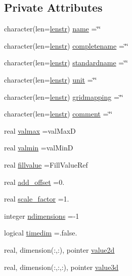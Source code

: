 \subsection*{Private Attributes}
\begin{DoxyCompactItemize}
\item 
character(len=\mbox{\hyperlink{namespacencdflib_a7d52315e1d9f473093f6f8fa245ea084}{lenstr}}) \mbox{\hyperlink{structncdflib_1_1t__varcf_a6796936503dc7771c79453eff76a90ac}{name}} =\char`\"{}\char`\"{}
\item 
character(len=\mbox{\hyperlink{namespacencdflib_a7d52315e1d9f473093f6f8fa245ea084}{lenstr}}) \mbox{\hyperlink{structncdflib_1_1t__varcf_a81068c0024daf690636e9796f0f04e10}{completename}} =\char`\"{}\char`\"{}
\item 
character(len=\mbox{\hyperlink{namespacencdflib_a7d52315e1d9f473093f6f8fa245ea084}{lenstr}}) \mbox{\hyperlink{structncdflib_1_1t__varcf_a4d96b5a56698ed074a83a35358076c97}{standardname}} =\char`\"{}\char`\"{}
\item 
character(len=\mbox{\hyperlink{namespacencdflib_a7d52315e1d9f473093f6f8fa245ea084}{lenstr}}) \mbox{\hyperlink{structncdflib_1_1t__varcf_ab5f4284c79f2ef3b1c612867594b5240}{unit}} =\char`\"{}\char`\"{}
\item 
character(len=\mbox{\hyperlink{namespacencdflib_a7d52315e1d9f473093f6f8fa245ea084}{lenstr}}) \mbox{\hyperlink{structncdflib_1_1t__varcf_a8e18f13161f032bff912b2f407eacb87}{gridmapping}} =\char`\"{}\char`\"{}
\item 
character(len=\mbox{\hyperlink{namespacencdflib_a7d52315e1d9f473093f6f8fa245ea084}{lenstr}}) \mbox{\hyperlink{structncdflib_1_1t__varcf_a15e530b17f1c195e83233da08851668a}{comment}} =\char`\"{}\char`\"{}
\item 
real \mbox{\hyperlink{structncdflib_1_1t__varcf_a48e70b8e0d1692a05c33b87d9002b893}{valmax}} =val\+MaxD
\item 
real \mbox{\hyperlink{structncdflib_1_1t__varcf_a28b65c2c870e8bda9d0b95dd041db33d}{valmin}} =val\+MinD
\item 
real \mbox{\hyperlink{structncdflib_1_1t__varcf_a569fe4fe040109c5bb97e10d0fa04b86}{fillvalue}} =Fill\+Value\+Ref
\item 
real \mbox{\hyperlink{structncdflib_1_1t__varcf_a32ec8ade2e9a04fcff07d72a0e0d904b}{add\+\_\+offset}} =0.
\item 
real \mbox{\hyperlink{structncdflib_1_1t__varcf_a1bf1ad1cf7c7fa22e707bc3a0c48ccfc}{scale\+\_\+factor}} =1.
\item 
integer \mbox{\hyperlink{structncdflib_1_1t__varcf_a13b70ca49fc19c32a56ba82bdab9c366}{ndimensions}} =-\/1
\item 
logical \mbox{\hyperlink{structncdflib_1_1t__varcf_ad52caf020759dfc71c2e56ba0fff9d3f}{timedim}} =.false.
\item 
real, dimension(\+:,\+:), pointer \mbox{\hyperlink{structncdflib_1_1t__varcf_a0cc5cb1dbd3f5b9f8c07533e0d53cb1b}{value2d}}
\item 
real, dimension(\+:,\+:,\+:), pointer \mbox{\hyperlink{structncdflib_1_1t__varcf_a199ecd99b95cd2db0bf1ba2bf4f5202f}{value3d}}
\end{DoxyCompactItemize}



